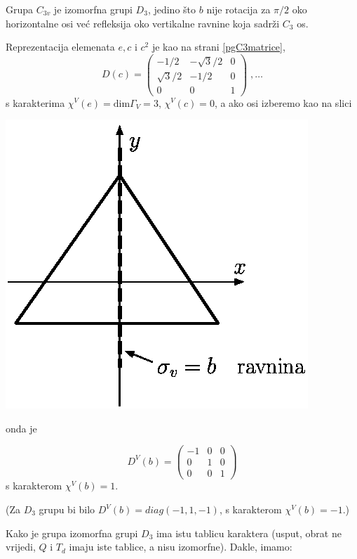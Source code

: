 \begin{primjer}

Grupa $C_{3v}$ je izomorfna grupi $D_3$, jedino što $b$ nije rotacija
za $\pi/2$ oko horizontalne osi već refleksija oko vertikalne ravnine
koja sadrži $C_3$ os.

Reprezentacija elemenata $e, c$ i  $c^2$ je kao na strani \ref{pgC3matrice},
\begin{displaymath}
D(c)=
\left(
\begin{array}{ccc}
-1/2 & -\sqrt{3}/2 & 0 \\
\sqrt{3}/2 & -1/2 & 0 \\
0 & 0 & 1
\end{array}\right) \;, \ldots
\end{displaymath}
s karakterima $\chi^{V}(e)=\mbox{dim}\Gamma_{V}=3$, $\chi^{V}(c)=0$,
a ako osi izberemo kao na slici
\centerline{\includegraphics[scale=0.8]{pics/C3vravnina.eps}}
onda je 

\begin{displaymath}
D^{V}(b)=
\left(
\begin{array}{ccc}
-1 & 0 & 0 \\
0 & 1 & 0 \\
0 & 0 & 1
\end{array}\right) 
\end{displaymath}
s karakterom $\chi^{V}(b)=1$.

(Za $D_3$  grupu bi bilo $D^{V}(b)=diag(-1, 1, -1)$, s karakterom
$\chi^{V}(b)=-1$.)

Kako je grupa izomorfna grupi $D_3$ ima istu tablicu karaktera (usput, obrat
ne vrijedi, $Q$ i $T_d$ imaju iste tablice, a nisu izomorfne). Dakle,
imamo:


\end{primjer}
